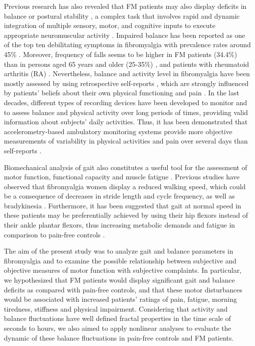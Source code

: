 \documentclass[12pt]{article}
\begin{document}
Previous research has also revealed that FM patients may also display deficits in balance or postural stability \cite{bennett2007internet, russek2009pilot, jones2009fibromyalgia}, a complex task that involves rapid and dynamic integration of multiple sensory, motor, and cognitive inputs to execute appropriate neuromuscular activity \cite{horak2006postural}. Impaired balance has been reported as one of the top ten debilitating symptoms in fibromyalgia with prevalence rates around 45\% \cite{bennett2007internet}. Moreover, frequency of falls seems to be higher in FM patients (34.4\%) \cite{russek2009pilot} than in persons aged 65 years and older (25-35\%) \cite{sattin1992falls}, and patients with rheumatoid arthritis (RA) \cite{meireles2014prevalence}. Nevertheless, balance and activity level in fibromyalgia have been mostly assessed by using retrospective self-reports \cite{russek2009pilot, mannerkorpi1994}, which are strongly influenced by patients' beliefs about their own physical functioning and pain \cite{verbunt2003disuse}. In the last decades, different types of recording devices have been developed to monitor and to assess balance and physical activity over long periods of times, providing valid information about subjects' daily activities. Thus, it has been demonstrated that accelerometry-based ambulatory monitoring systems provide more objective measurements of variability in physical activities and pain over several days than self-reports \cite{verbunt2009assessment}.

Biomechanical analysis of gait also constitutes a useful tool for the assessment of motor function, functional capacity and muscle fatigue \cite{pierrynowski2005women, bendtsen1997evidence}. Previous studies have observed that fibromyalgia women display a reduced walking speed, which could be a consequence of decreases in stride length and cycle frequency, as well as bradykinesia \cite{jimenez2009spatial, auvinet2006gait}. Furthermore, it has been suggested that gait at normal speed in these patients may be preferentially achieved by using their hip flexors instead of their ankle plantar flexors, thus increasing metabolic demands and fatigue in comparison to pain-free controls \cite{pierrynowski2005women}. 

The aim of the present study was to analyze gait and balance parameters in fibromyalgia and to examine the possible relationship between subjective and objective measures of motor function with subjective complaints. In particular, we hypothesized that FM patients would display significant gait and balance deficits as compared with pain-free controls, and that these motor disturbances would be associated with increased patients' ratings of pain, fatigue, morning tiredness, stiffness and physical impairment. Considering that activity and balance fluctuations have well defined fractal properties in the time scale of seconds to hours, we also aimed to apply nonlinear analyses to evaluate the dynamic of these balance fluctuations in pain-free controls and FM patients.\\
\end{document}
